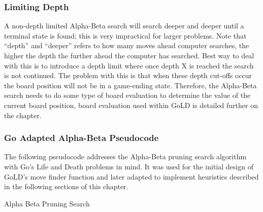 \documentclass{l4proj}
\begin{document}
\subsubsection{Limiting Depth}
A non-depth limited Alpha-Beta search will search deeper and deeper until a terminal state is found; this is very impractical for larger problems. Note that “depth” and “deeper” refers to how many moves ahead computer searches, the higher the depth the further ahead the computer has searched. Best way to deal with this is to introduce a depth limit where once depth X is reached the search is not continued. The problem with this is that when these depth cut-offs occur the board position will not be in a game-ending state. Therefore, the Alpha-Beta search needs to do some type of board evaluation to determine the value of the current board position, board evaluation used within GoLD is detailed further on the chapter.

\subsubsection{Go Adapted Alpha-Beta Pseudocode}
The following pseudocode addresses the Alpha-Beta pruning search algorithm with Go's Life and Death problems in mind. It was used for the initial design of GoLD's move finder function and later adapted to implement heuristics described in the following sections of this chapter.

\begin{algorithm}[H]
\caption{Alpha Beta Pruning Search}\label{Alpha-Beta}
    \DontPrintSemicolon
\end{algorithm}
\end{document}
